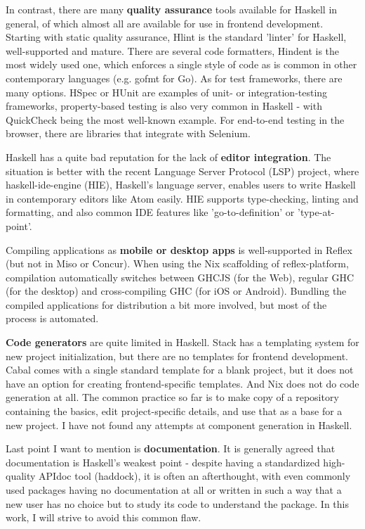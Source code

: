 \documentclass[english,odsaz]{fitthesis}
\begin{document}
In contrast, there are many \textbf{quality assurance} tools available for Haskell in
general, of which almost all are available for use in frontend
development. Starting with static quality assurance, Hlint is the standard
'linter' for Haskell, well-supported and mature. There are several code
formatters, Hindent is the most widely used one, which enforces a single style
of code as is common in other contemporary languages (e.g. gofmt for Go).
As for test frameworks, there are many options. HSpec or HUnit are examples of
unit- or integration-testing frameworks, property-based testing is also very
common in Haskell - with QuickCheck being the most well-known example. For
end-to-end testing in the browser, there are libraries that integrate with Selenium.

Haskell has a quite bad reputation for the lack of \textbf{editor integration}. The
situation is better with the recent Language Server Protocol (LSP) project,
where haskell-ide-engine (HIE), Haskell's language server, enables users to
write Haskell in contemporary editors like Atom easily. HIE supports
type-checking, linting and formatting, and also common IDE features like
'go-to-definition' or 'type-at-point'.

Compiling applications as \textbf{mobile or desktop apps} is well-supported in Reflex
(but not in Miso or Concur). When using the Nix scaffolding of reflex-platform,
compilation automatically switches between GHCJS (for the Web), regular GHC (for
the desktop) and cross-compiling GHC (for iOS or Android). Bundling the compiled
applications for distribution a bit more involved, but most of the process is
automated.

\textbf{Code generators} are quite limited in Haskell. Stack has a templating system for
new project initialization, but there are no templates for frontend development.
Cabal comes with a single standard template for a blank project, but it does not
have an option for creating frontend-specific templates. And Nix does not do
code generation at all. The common practice so far is to make copy of a
repository containing the basics, edit project-specific details, and use that as
a base for a new project. I have not found any attempts at component generation
in Haskell.

Last point I want to mention is \textbf{documentation}. It is generally agreed that
documentation is Haskell's weakest point - despite having a standardized
high-quality APIdoc tool (haddock), it is often an afterthought, with even
commonly used packages having no documentation at all or written in such a way
that a new user has no choice but to study its code to understand the
package. In this work, I will strive to avoid this common flaw.
\end{document}
